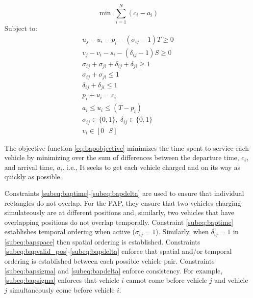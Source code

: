 \documentclass[utf8]{FrontiersinHarvard}
\begin{document}
\begin{equation}
	\label{eq:bapobjective}
	\min\; \sum_{i=1}^N (c_i - a_i)
\end{equation}
Subject to:
\begin{subequations}
\label{eq:bapconstrs}
\begin{align}
    u_j - u_i - p_i - (\sigma_{ij} - 1)T \geq 0                   \label{subeq:baptime}         \\
    v_j - v_i - s_i - (\delta_{ij} - 1)S \geq 0                   \label{subeq:bapspace}        \\
    \sigma_{ij} + \sigma_{ji} + \delta_{ij} + \delta_{ji} \geq 1  \label{subeq:bapvalid_pos}    \\
    \sigma_{ij} + \sigma_{ji} \leq 1                              \label{subeq:bapsigma}        \\
    \delta_{ij} + \delta_{ji} \leq 1                              \label{subeq:bapdelta}        \\
    p_i + u_i = c_i                                               \label{subeq:bapdetach}       \\
    a_i \leq u_i \leq (T - p_i)                                   \label{subeq:bapvalid_starts} \\
    \sigma_{ij} \in \{0,1\},\;\delta_{ij} \in \{0,1\}\;           \label{subeq:bapsdspace}      \\
    v_i \in [0 \mbox{ } S ]                                       \label{subeq:bapvspace}
\end{align}
\end{subequations}

\noindent

The objective function \eqref{eq:bapobjective} minimizes the time spent to service each vehicle by minimizing over the
sum of differences between the departure time, $c_i$, and arrival time, $a_i$. i.e., It seeks to get each vehicle charged and on its way as quickly as possible.

Constraints \ref{subeq:baptime}-\ref{subeq:bapdelta} are used to ensure that individual rectangles do not overlap. For the PAP, they ensure that two vehicles charging simulateously are at different positions and, similarly, two vehicles that have overlapping positions do not overlap temporally. Constraint \eqref{subeq:baptime} establishes temporal ordering when active ($\sigma_{ij}=1$). Similarly, when $\delta_{ij} =1$ in \eqref{subeq:bapspace} then spatial ordering is established. Constraints \ref{subeq:bapvalid_pos}-\ref{subeq:bapdelta} enforce that spatial and/or temporal ordering is established between each possible vehicle pair. Constraints \eqref{subeq:bapsigma} and \eqref{subeq:bapdelta} enforce consistency. For example, \eqref{subeq:bapsigma} enforces that vehicle $i$ cannot come before vehicle $j$ and vehicle $j$ simultaneously come before vehicle $i$.
\end{document}
